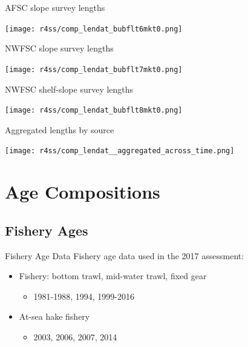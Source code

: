 \documentclass[pdf]{beamer}\usepackage[]{graphicx}\usepackage[]{color}
\begin{document}
\begin{frame}{AFSC slope survey lengths}
  \begin{center}
    \texttt{[image: r4ss/comp\_lendat\_bubflt6mkt0.png]}
  \end{center}
\end{frame}

\begin{frame}{NWFSC slope survey lengths}
  \begin{center}
    \texttt{[image: r4ss/comp\_lendat\_bubflt7mkt0.png]}
  \end{center}
\end{frame}

\begin{frame}{NWFSC shelf-slope survey lengths}
  \begin{center}
    \texttt{[image: r4ss/comp\_lendat\_bubflt8mkt0.png]}
  \end{center}
\end{frame}

\begin{frame}{Aggregated lengths by source}
  \begin{center}
    \texttt{[image: r4ss/comp\_lendat\_\_aggregated\_across\_time.png]}
  \end{center}
\end{frame}

\section{Age Compositions}
\subsection{Fishery Ages}
\begin{frame}{Fishery Age Data}
  Fishery age data used in the 2017 assessment:
  \begin{itemize}
    \item Fishery: bottom trawl, mid-water trawl, fixed gear
      \begin{itemize}
        \item 1981-1988, 1994, 1999-2016
      \end{itemize}
    \item At-sea hake fishery
      \begin{itemize}
        \item 2003, 2006, 2007, 2014
      \end{itemize}
  \end{itemize}
\end{frame}
\end{document}
